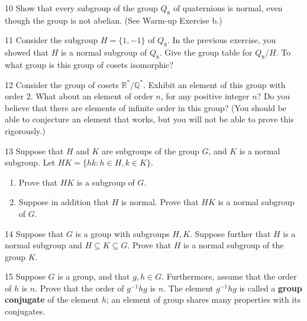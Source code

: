 \begin{problem}{10}
    Show that every subgroup of the group $Q_8$ of quaternions is normal, even though the
    group is not abelian. (See Warm-up Exercise b.)
\end{problem}
\unsolved

\begin{problem}{11}
    Consider the subgroup $H = \{1, -1\}$ of $Q_8$. In the previous exercise, you showed
    that $H$ is a normal subgroup of $Q_8$. Give the group table for $Q_8/H$. To what
    group is this group of cosets isomorphic?
\end{problem}
\unsolved

\begin{problem}{12}
    Consider the group of cosets $\mathbb{R}^*/\mathbb{Q}^*$. Exhibit an element of this
    group with order 2. What about an element of order $n$, for any positive integer $n$?
    Do you believe that there are elements of infinite order in this group? (You should be
    able to conjecture an element that works, but you will not be able to prove this
    rigorously.)
\end{problem}
\unsolved

\begin{problem}{13}
    Suppose that $H$ and $K$ are subgroups of the group $G$, and $K$ is a normal subgroup.
    Let $HK = \{hk : h \in H, k \in K\}$.
    \begin{enumerate}
        \item[(a)] Prove that $HK$ is a subgroup of $G$.
        \item[(b)] Suppose in addition that $H$ is normal. Prove that $HK$ is a normal
        subgroup of $G$.
    \end{enumerate}
\end{problem}
\unsolved

\begin{problem}{14}
    Suppose that $G$ is a group with subgroups $H, K$. Suppose further that $H$ is a normal
    subgroup and $H \subseteq K \subseteq G$. Prove that $H$ is a normal subgroup of the
    group $K$.
\end{problem}
\unsolved

\begin{problem}{15}
    Suppose $G$ is a group, and that $g, h \in G$. Furthermore, assume that the order of
    $h$ is $n$. Prove that the order of $g^{-1}hg$ is $n$. The element $g^{-1}hg$ is called
    a \textbf{group conjugate} of the element $h$; an element of group shares many
    properties with its conjugates.
\end{problem}
\unsolved

